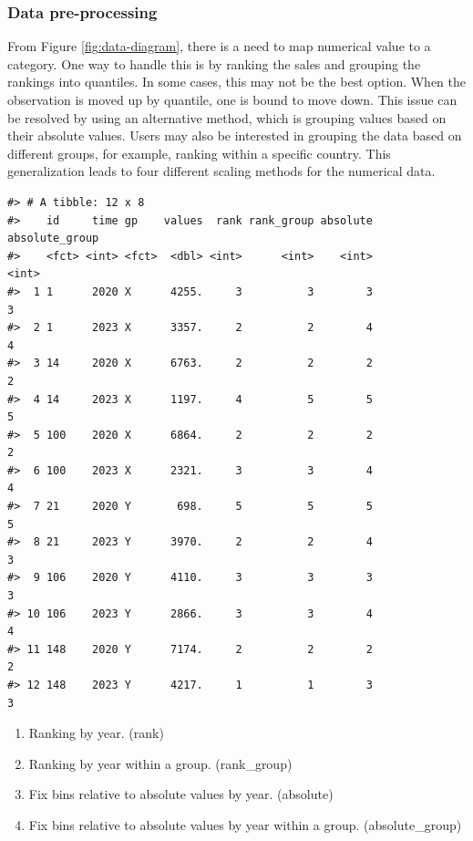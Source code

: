 \hypertarget{data-pre-processing}{%
\subsubsection{Data pre-processing}\label{data-pre-processing}}

From Figure \ref{fig:data-diagram}, there is a need to map numerical value to a category. One way to handle this is by ranking the sales and grouping the rankings into quantiles. In some cases, this may not be the best option. When the observation is moved up by quantile, one is bound to move down. This issue can be resolved by using an alternative method, which is grouping values based on their absolute values. Users may also be interested in grouping the data based on different groups, for example, ranking within a specific country. This generalization leads to four different scaling methods for the numerical data.

\begin{verbatim}
#> # A tibble: 12 x 8
#>    id     time gp    values  rank rank_group absolute absolute_group
#>    <fct> <int> <fct>  <dbl> <int>      <int>    <int>          <int>
#>  1 1      2020 X      4255.     3          3        3              3
#>  2 1      2023 X      3357.     2          2        4              4
#>  3 14     2020 X      6763.     2          2        2              2
#>  4 14     2023 X      1197.     4          5        5              5
#>  5 100    2020 X      6864.     2          2        2              2
#>  6 100    2023 X      2321.     3          3        4              4
#>  7 21     2020 Y       698.     5          5        5              5
#>  8 21     2023 Y      3970.     2          2        4              3
#>  9 106    2020 Y      4110.     3          3        3              3
#> 10 106    2023 Y      2866.     3          3        4              4
#> 11 148    2020 Y      7174.     2          2        2              2
#> 12 148    2023 Y      4217.     1          1        3              3
\end{verbatim}

\begin{enumerate}
\def\labelenumi{\arabic{enumi}.}
\tightlist
\item
  Ranking by year. (rank)
\item
  Ranking by year within a group. (rank\_group)
\item
  Fix bins relative to absolute values by year. (absolute)
\item
  Fix bins relative to absolute values by year within a group. (absolute\_group)
\end{enumerate}

